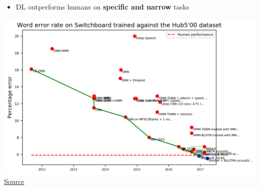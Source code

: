 \documentclass[usenames,dvipsnames]{beamer}
\begin{document}
    \begin{frame}{\secname}
        \begin{itemize}
            \item DL outperforms humans on \textbf{specific and narrow} tasks
        \end{itemize}
        \begin{center}
            \includegraphics[width=0.9\linewidth]{figures/DL_fundamentals/speech_recog_perf.png}
            \vspace{-0.7em}
            {\tiny \href{https://www.eff.org/ai/metrics}{Source}}
        \end{center}
    \end{frame}
    
\end{document}
